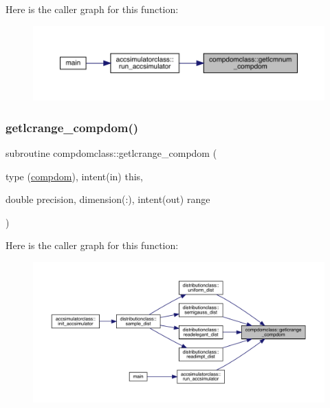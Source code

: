 Here is the caller graph for this function\+:\nopagebreak
\begin{figure}[H]
\begin{center}
\leavevmode
\includegraphics[width=350pt]{namespacecompdomclass_a545b0a4e8dce9ec9c326806ed1b36598_icgraph}
\end{center}
\end{figure}
\mbox{\label{namespacecompdomclass_ad0a907860c5bf17c263d8ad957c7ed1d}} 
\subsubsection{\texorpdfstring{getlcrange\_compdom()}{getlcrange\_compdom()}}
{\footnotesize\ttfamily subroutine compdomclass\+::getlcrange\+\_\+compdom (\begin{DoxyParamCaption}\item[{type (\mbox{\hyperlink{namespacecompdomclass_structcompdomclass_1_1compdom}{compdom}}), intent(in)}]{this,  }\item[{double precision, dimension(\+:), intent(out)}]{range }\end{DoxyParamCaption})}

Here is the caller graph for this function\+:\nopagebreak
\begin{figure}[H]
\begin{center}
\leavevmode
\includegraphics[width=350pt]{namespacecompdomclass_ad0a907860c5bf17c263d8ad957c7ed1d_icgraph}
\end{center}
\end{figure}
\mbox{\label{namespacecompdomclass_a7c7c1450a459bb1753ef8230ab0d7651}} 
